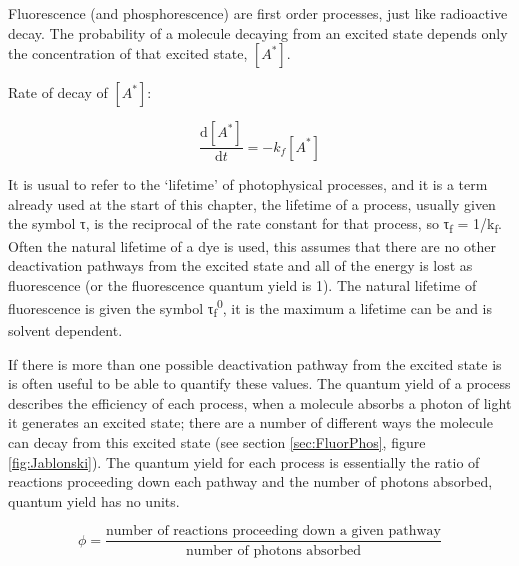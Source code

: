 \documentclass[
]{book}
\begin{document}
Fluorescence (and phosphorescence) are first order processes, just like radioactive decay. The probability of a molecule decaying from an excited state depends only the concentration of that excited state, \([A^\ast]\).

Rate of decay of \([A^\ast]\):

\begin{equation}
\frac{\textrm{d}[A^\ast]}{\textrm{d}t}=-k_f [A^\ast]
\label{eq:fluordecay}
\end{equation}

It is usual to refer to the `lifetime' of photophysical processes, and it is a term already used at the start of this chapter, the lifetime of a process, usually given the symbol τ, is the reciprocal of the rate constant for that process, so τ\textsubscript{f} = 1/k\textsubscript{f}. Often the natural lifetime of a dye is used, this assumes that there are no other deactivation pathways from the excited state and all of the energy is lost as fluorescence (or the fluorescence quantum yield is 1). The natural lifetime of fluorescence is given the symbol τ\textsubscript{f}\textsuperscript{0}, it is the maximum a lifetime can be and is solvent dependent.

If there is more than one possible deactivation pathway from the excited state is is often useful to be able to quantify these values. The quantum yield of a process describes the efficiency of each process, when a molecule absorbs a photon of light it generates an excited state; there are a number of different ways the molecule can decay from this excited state (see section \ref{sec:FluorPhos}, figure \ref{fig:Jablonski}). The quantum yield for each process is essentially the ratio of reactions proceeding down each pathway and the number of photons absorbed, quantum yield has no units.

\begin{equation}
\phi = \frac{\textrm{number of reactions proceeding down a given pathway}}{\textrm{number of photons absorbed}}
\label{eq:QYdef}
\end{equation}
\end{document}
